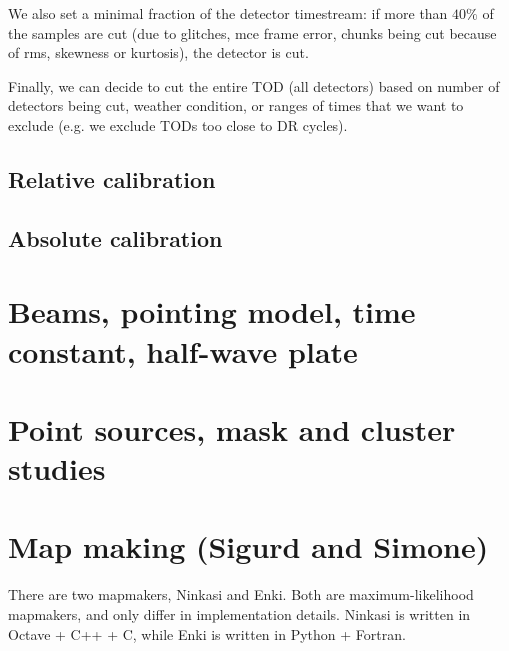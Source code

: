 \documentclass[a4paper, 11pt]{article}
\begin{document}
We also set a minimal fraction of the detector timestream: if more than $40\%$ of the samples are cut (due to glitches, mce frame error, chunks being cut because of rms, skewness or kurtosis), the detector is cut.

Finally, we can decide to cut the entire TOD (all detectors) based on number of detectors being cut, weather condition, or ranges of times that we want to exclude (e.g. we exclude TODs too close to DR cycles).

\subsection{Relative calibration}
\label{subsec:relcal}

\subsection{Absolute calibration}



\section{Beams, pointing model, time constant, half-wave plate}

\section{Point sources, mask and cluster studies}

\section{Map making (Sigurd and Simone)}
There are two mapmakers, Ninkasi and Enki. Both are maximum-likelihood mapmakers,
and only differ in implementation details. Ninkasi is written in Octave + C++ + C,
while Enki is written in Python + Fortran.
\end{document}
